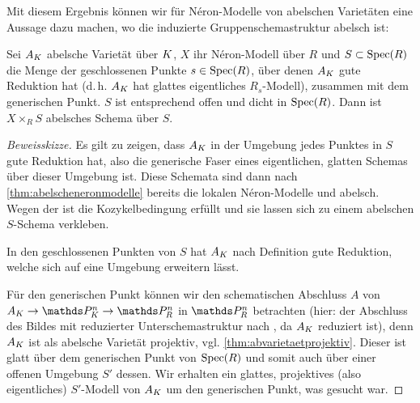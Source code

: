 \documentclass[german]{scrreprt}
\begin{document}
Mit diesem Ergebnis können wir für Néron-Modelle von
abelschen Varietäten eine Aussage dazu machen, wo die induzierte
Gruppenschemastruktur abelsch ist:
\begin{Satz}
  \cite[1.4, Theorem 3]{neron}
  Sei $A_{K}$ abelsche Varietät über $K$,
  $X$ ihr Néron-Modell über $R$ und
  $S\subset\operatorname{Spec}(R)$ die Menge der geschlossenen Punkte
  $s\in\operatorname{Spec}(R)$, über denen $A_{K}$ gute Reduktion hat (d.\,h. $A_{K}$
  hat glattes eigentliches $R_s$-Modell), zusammen mit dem generischen
  Punkt.
  $S$ ist entsprechend offen und dicht in $\operatorname{Spec}(R)$.
  Dann ist $X\times_R S$ abelsches Schema über $S$.
  \begin{proof}[Beweisskizze]
    Es gilt zu zeigen, dass $A_{K}$ in der Umgebung jedes Punktes in
    $S$ gute Reduktion hat, also die generische Faser eines
    eigentlichen, glatten Schemas über dieser Umgebung ist.
    Diese Schemata sind dann nach \autoref{thm:abelscheneronmodelle}
    bereits die lokalen Néron-Modelle und abelsch.
    Wegen der \NAbbEig ist die Kozykelbedingung
    erfüllt und sie lassen sich zu einem abelschen $S$-Schema
    verkleben.

    In den geschlossenen Punkten von $S$ hat $A_{K}$ nach Definition
    gute Reduktion, welche sich auf eine Umgebung erweitern
    lässt.
    
    Für den generischen Punkt können wir den schematischen
    Abschluss $A$ von $A_\K\to\P_\K^n\to\P_R^n$ in $\P_R^n$
    betrachten
    (hier: der Abschluss des Bildes mit reduzierter
    Unterschemastruktur nach \cite[Remark 10.32]{wedhorn}, da $A_{K}$
    reduziert ist),
    denn $A_{K}$ ist als abelsche Varietät projektiv,
    vgl. \autoref{thm:abvarietaetprojektiv}.
    Dieser ist glatt über dem generischen Punkt von $\operatorname{Spec}(R)$
    und somit auch über einer offenen Umgebung $S'$ dessen.
    Wir erhalten ein glattes, projektives (also eigentliches)
    $S'$-Modell von $A_{K}$ um den generischen Punkt, was gesucht war.
  \end{proof}
\end{Satz}

\end{document}
